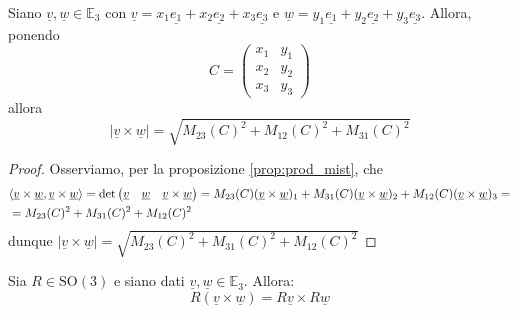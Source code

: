 %
\vspace{0.5cm}
\begin{cor}[\textcolor{blue}{norma del prodotto vettoriale}]
Siano $\underline{v}, \underline{w} \in \mathbb{E}_3$ con $\underline{v} = x_1 \underline{e_1} + x_2 \underline{e_2} + x_3 \underline{e_3}$ e $\underline{w} = y_1 \underline{e_1} + y_2 \underline{e_2} + y_3 \underline{e_3}$. Allora, ponendo
%
\[C = \begin{pmatrix}
	x_1 & y_1 \\
	x_2 & y_2 \\
	x_3 & y_3 
\end{pmatrix}\]
%
allora
%
\[|\underline{v} \times \underline{w}| = \sqrt{M_{23}(C)^2 + M_{12}(C)^2 + M_{31}(C)^2}\]
\label{cor:norm_cross_prod}
\end{cor}
%
%
\begin{proof}
Osserviamo, per la proposizione \ref{prop:prod_mist}, che
%
\begin{align*}
	&\langle \underline{v} \times \underline{w}, \underline{v} \times \underline{w} \rangle = \text{det}\begin{pmatrix}
	\underline{v} & \underline{w} & \underline{v} \times \underline{w}
	\end{pmatrix} = M_{23}(C) (\underline{v} \times \underline{w})_1 + M_{31}(C) (\underline{v} \times \underline{w})_2 + M_{12}(C) (\underline{v} \times \underline{w})_3 = \\
	&= M_{23}(C)^2 + M_{31}(C)^2 + M_{12}(C)^2
\end{align*}
%
\noindent dunque $|\underline{v} \times \underline{w}| = \sqrt{M_{23}(C)^2 + M_{31}(C)^2 + M_{12}(C)^2}$
\end{proof}
%
%
\vspace{0.5cm}
\begin{prop}
Sia $R \in \text{SO}(3)$ e siano dati $\underline{v}, \underline{w} \in \mathbb{E}_3$. Allora:
%
\begin{equation*}
R(\underline{v} \times \underline{w}) = R\underline{v} \times R\underline{w}
\end{equation*}
\end{prop}
%
